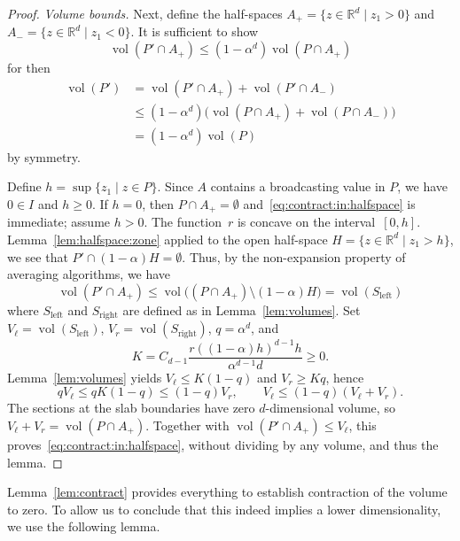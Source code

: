 \documentclass[preprint,12pt,a4paper]{elsarticle}
\theoremstyle{plain}
\theoremstyle{definition}
\DeclareMathOperator{\vol}{vol}
\newcommand{\IR}{\mathbb{R}}
\renewcommand{\leq}{\leqslant}
\renewcommand{\geq}{\geqslant}
\begin{document}
\begin{proof}
	\medskip

	\noindent\emph{Volume bounds.}
	Next, define the half-spaces
	$A_+ = \{z\in \IR^d \mid z_1 > 0\}$
	and
	$A_- = \{z\in \IR^d \mid z_1 < 0\}$.
	It is sufficient to show
	\begin{equation}\label{eq:contract:in:halfspace}
		{\vol(P'\cap A_+)}
		\leq
		(1-\alpha^d)
		{\vol(P\cap A_+)}
	\end{equation}
	for then
	\begin{align*}
		\vol(P')
		&=\vol(P'\cap A_+)+\vol(P'\cap A_-)\\
		&\leq(1-\alpha^d)\big(\vol(P\cap A_+)+\vol(P\cap A_-)\big)\\
		&=(1-\alpha^d)\vol(P)
	\end{align*}
	by symmetry.

	Define $h = \sup\{ z_1 \mid z\in P\}$.
	Since $A$ contains a broadcasting value in $P$, we have $0\in I$ and $h\geq 0$.
	If $h=0$, then $P\cap A_+=\emptyset$ and~\eqref{eq:contract:in:halfspace} is immediate; assume $h>0$.
	The function~$r$ is concave on the interval~$[0,h]$.
	Lemma~\ref{lem:halfspace:zone} applied to the open half-space
	$H = \{ z\in \IR^d \mid z_1 > h\}$, we see that
	$P' \cap (1-\alpha)H = \emptyset$.
	Thus, by the non-expansion property of averaging algorithms, we have
	\begin{equation*}
		\vol(P'\cap A_+) \leq \vol\big((P\cap A_+) \setminus (1-\alpha)H\big) = \vol(S_\mathrm{left})
	\end{equation*}
	where $S_\mathrm{left}$ and $S_\mathrm{right}$ are defined as in Lemma~\ref{lem:volumes}.
	Set $V_\ell=\vol(S_\mathrm{left})$, $V_r=\vol(S_\mathrm{right})$, $q=\alpha^d$, and
	\[
		K=C_{d-1}\frac{r((1-\alpha)h)^{d-1}h}{\alpha^{d-1}d}\geq 0.
	\]
	Lemma~\ref{lem:volumes} yields $V_\ell\leq K(1-q)$ and $V_r\geq Kq$, hence
	\begin{equation*}
		qV_\ell\leq qK(1-q)\leq(1-q)V_r,
		\qquad
		V_\ell\leq(1-q)(V_\ell+V_r).
	\end{equation*}
	The sections at the slab boundaries have zero $d$-dimensional volume, so $V_\ell+V_r=\vol(P\cap A_+)$.
	Together with $\vol(P'\cap A_+)\leq V_\ell$, this proves~\eqref{eq:contract:in:halfspace}, without dividing by any volume,
	and thus the lemma.
\end{proof}

Lemma~\ref{lem:contract} provides everything to establish contraction of the volume to zero.
To allow us to conclude that this indeed implies a lower dimensionality, we use the following lemma.
\end{document}
